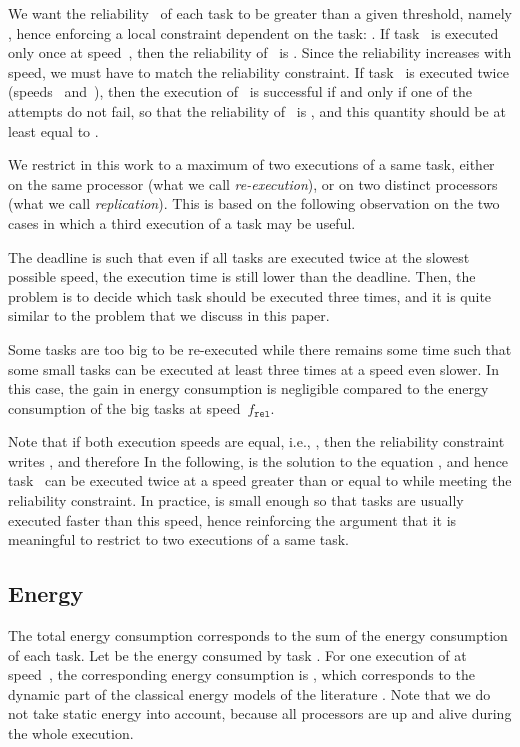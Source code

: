 \documentclass[a4paper]{article}
\theoremstyle{plain}
\theoremstyle{definition}
\theoremstyle{remark}
\newcommand{\fr}{\ensuremath{f_{\texttt{rel}}}\xspace}
\begin{document}
We want the reliability~ of each task  to be greater than
a given threshold, namely , hence enforcing a local
constraint dependent on the task: .   
If task~ is executed only once at speed~, then the
reliability of~ is . Since the reliability increases
with speed, we must have  to match the reliability
constraint.
If task~ is executed twice (speeds~ and~),
then the execution of~ is successful if and only if one of the
attempts do not fail, so that the reliability of~ is , and this quantity should be
at least equal to . 

We restrict in this work to a maximum of two executions of a same task,
either on the same processor (what we call {\em re-execution}), or on
two distinct processors (what we call {\em replication}).  This is
based on the following observation on the two cases in which a third
execution of a task may be useful. 
\begin{compactenum}
\item The deadline is such that even if all tasks are executed
  twice at the slowest possible speed, the execution time is still
  lower than the deadline. Then, the problem is to decide which task
  should be executed three times, and it is quite similar to the
  problem that we discuss in this paper. 
\item Some tasks are too big to be re-executed while there remains
  some time such that some small tasks can be executed at least three
  times at a speed even slower. In this case, the gain in energy
  consumption is negligible compared to the energy consumption of the
  big tasks at speed~\fr.
\end{compactenum}


Note that if both execution speeds are equal, i.e.,
, then the reliability constraint writes
, and
therefore  In the following,  is the solution to
the equation , and hence task~ can be executed twice at
a speed greater than or equal to  while meeting the reliability
constraint. In practice,  is small enough so that tasks are
usually executed faster than this speed, hence reinforcing the
argument that it is meaningful to restrict to two executions of a same
task. 


\subsection{Energy}


The total energy consumption corresponds to the sum of the energy
consumption of each task. Let  be the energy consumed by
task . For one execution of  at speed~, the
corresponding energy consumption is , which corresponds to the dynamic part of the
classical energy models of the literature \cite{pow3IPDPS,BKP07}.  
Note that we do not take static energy into account, because all 
processors are up and alive during the whole execution.
\end{document}
